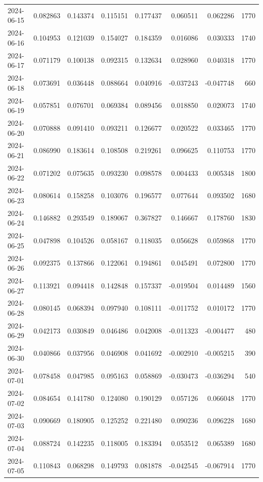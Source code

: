 \begin{tabular}{lrrrrrrr}
2024-06-15 & 0.082863 & 0.143374 & 0.115151 & 0.177437 & 0.060511 & 0.062286 & 1770 \\
2024-06-16 & 0.104953 & 0.121039 & 0.154027 & 0.184359 & 0.016086 & 0.030333 & 1740 \\
2024-06-17 & 0.071179 & 0.100138 & 0.092315 & 0.132634 & 0.028960 & 0.040318 & 1770 \\
2024-06-18 & 0.073691 & 0.036448 & 0.088664 & 0.040916 & -0.037243 & -0.047748 & 660 \\
2024-06-19 & 0.057851 & 0.076701 & 0.069384 & 0.089456 & 0.018850 & 0.020073 & 1740 \\
2024-06-20 & 0.070888 & 0.091410 & 0.093211 & 0.126677 & 0.020522 & 0.033465 & 1770 \\
2024-06-21 & 0.086990 & 0.183614 & 0.108508 & 0.219261 & 0.096625 & 0.110753 & 1770 \\
2024-06-22 & 0.071202 & 0.075635 & 0.093230 & 0.098578 & 0.004433 & 0.005348 & 1800 \\
2024-06-23 & 0.080614 & 0.158258 & 0.103076 & 0.196577 & 0.077644 & 0.093502 & 1680 \\
2024-06-24 & 0.146882 & 0.293549 & 0.189067 & 0.367827 & 0.146667 & 0.178760 & 1830 \\
2024-06-25 & 0.047898 & 0.104526 & 0.058167 & 0.118035 & 0.056628 & 0.059868 & 1770 \\
2024-06-26 & 0.092375 & 0.137866 & 0.122061 & 0.194861 & 0.045491 & 0.072800 & 1770 \\
2024-06-27 & 0.113921 & 0.094418 & 0.142848 & 0.157337 & -0.019504 & 0.014489 & 1560 \\
2024-06-28 & 0.080145 & 0.068394 & 0.097940 & 0.108111 & -0.011752 & 0.010172 & 1770 \\
2024-06-29 & 0.042173 & 0.030849 & 0.046486 & 0.042008 & -0.011323 & -0.004477 & 480 \\
2024-06-30 & 0.040866 & 0.037956 & 0.046908 & 0.041692 & -0.002910 & -0.005215 & 390 \\
2024-07-01 & 0.078458 & 0.047985 & 0.095163 & 0.058869 & -0.030473 & -0.036294 & 540 \\
2024-07-02 & 0.084654 & 0.141780 & 0.124080 & 0.190129 & 0.057126 & 0.066048 & 1770 \\
2024-07-03 & 0.090669 & 0.180905 & 0.125252 & 0.221480 & 0.090236 & 0.096228 & 1680 \\
2024-07-04 & 0.088724 & 0.142235 & 0.118005 & 0.183394 & 0.053512 & 0.065389 & 1680 \\
2024-07-05 & 0.110843 & 0.068298 & 0.149793 & 0.081878 & -0.042545 & -0.067914 & 1770 \\

\end{tabular}

